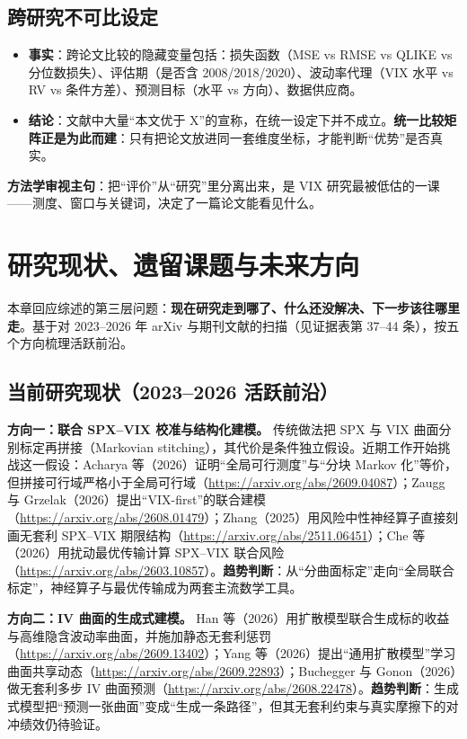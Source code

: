 \documentclass[11pt,a4paper]{article}
\begin{document}
\subsection{跨研究不可比设定}

\begin{itemize}[leftmargin=2.2em]
  \item \textbf{事实}：跨论文比较的隐藏变量包括：损失函数（MSE vs RMSE vs QLIKE vs 分位数损失）、评估期（是否含 2008/2018/2020）、波动率代理（VIX 水平 vs RV vs 条件方差）、预测目标（水平 vs 方向）、数据供应商。
  \item \textbf{结论}：文献中大量“本文优于 X”的宣称，在统一设定下并不成立。\textbf{统一比较矩阵正是为此而建}：只有把论文放进同一套维度坐标，才能判断“优势”是否真实。
\end{itemize}

\textbf{方法学审视主句}：把“评价”从“研究”里分离出来，是 VIX 研究最被低估的一课——测度、窗口与关键词，决定了一篇论文能看见什么。

\newpage
\section{研究现状、遗留课题与未来方向}

本章回应综述的第三层问题：\textbf{现在研究走到哪了、什么还没解决、下一步该往哪里走}。基于对 2023--2026 年 arXiv 与期刊文献的扫描（见证据表第 37--44 条），按五个方向梳理活跃前沿。

\subsection{当前研究现状（2023--2026 活跃前沿）}

\textbf{方向一：联合 SPX--VIX 校准与结构化建模。} 传统做法把 SPX 与 VIX 曲面分别标定再拼接（Markovian stitching），其代价是条件独立假设。近期工作开始挑战这一假设：Acharya 等（2026）证明“全局可行测度”与“分块 Markov 化”等价，但拼接可行域严格小于全局可行域（\url{https://arxiv.org/abs/2609.04087}）；Zaugg 与 Grzelak（2026）提出“VIX-first”的联合建模（\url{https://arxiv.org/abs/2608.01479}）；Zhang（2025）用风险中性神经算子直接刻画无套利 SPX--VIX 期限结构（\url{https://arxiv.org/abs/2511.06451}）；Che 等（2026）用扰动最优传输计算 SPX--VIX 联合风险（\url{https://arxiv.org/abs/2603.10857}）。\textbf{趋势判断}：从“分曲面标定”走向“全局联合标定”，神经算子与最优传输成为两套主流数学工具。

\textbf{方向二：IV 曲面的生成式建模。} Han 等（2026）用扩散模型联合生成标的收益与高维隐含波动率曲面，并施加静态无套利惩罚（\url{https://arxiv.org/abs/2609.13402}）；Yang 等（2026）提出“通用扩散模型”学习曲面共享动态（\url{https://arxiv.org/abs/2609.22893}）；Buchegger 与 Gonon（2026）做无套利多步 IV 曲面预测（\url{https://arxiv.org/abs/2608.22478}）。\textbf{趋势判断}：生成式模型把“预测一张曲面”变成“生成一条路径”，但其无套利约束与真实摩擦下的对冲绩效仍待验证。
\end{document}
